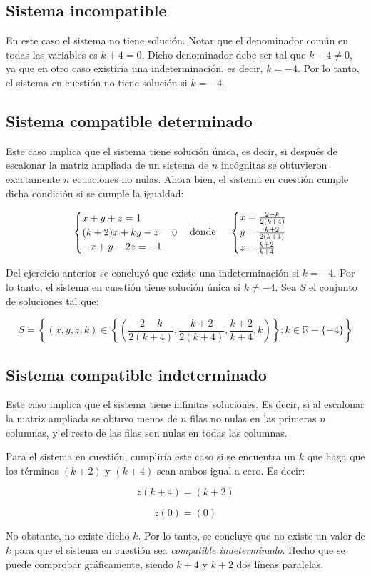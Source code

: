 \documentclass[a4paper,spanish]{article}
\begin{document}
\subsection*{Sistema incompatible}

En este caso el sistema no tiene solución. Notar que el denominador común en todas las variables es $k + 4 = 0$. Dicho denominador debe ser tal que $k+4 \neq 0$, ya que en otro caso existiría una indeterminación, es decir, $k = -4$. Por lo tanto, el sistema en cuestión no tiene solución si $k = -4$.

\subsection*{Sistema compatible determinado}

Este caso implica que el sistema tiene solución única, es decir, si después de escalonar la matriz ampliada de un sistema de $n$ incógnitas se obtuvieron exactamente $n$ ecuaciones no nulas. Ahora bien, el sistema en cuestión cumple dicha condición si se cumple la igualdad:

\[
    \begin{cases}
        x + y + z = 1       \\
        (k+2)x + ky -z  = 0 \\
        -x +y -2z = -1
    \end{cases}
    \text{donde \quad}
    \begin{cases}
        x  = \frac{2-k}{2(k+4)} \\
        y = \frac{k+2}{2(k+4)}  \\
        z = \frac{k+2}{k+4}
    \end{cases}
\]

Del ejercicio anterior se concluyó que existe una indeterminación si $k = -4$. Por lo tanto, el sistema en cuestión tiene solución única si $k\neq-4$. Sea $S$ el conjunto de soluciones tal que:

\[
    S = \left\{
    (x, y, z, k)
    \in
    \left\{ (\frac{2-k}{2(k+4)}, \frac{k+2}{2(k+4)}, \frac{k+2}{k+4}, k) \right\}:
    k \in \mathbb{R} - \{-4\}
    \right\}
\]

\subsection*{Sistema compatible indeterminado}

Este caso implica que el sistema tiene infinitas soluciones. Es decir, si al escalonar la matriz ampliada se obtuvo menos de $n$ filas no nulas en las primeras $n$ columnas, y el resto de las filas son nulas en todas las columnas.

Para el sistema en cuestión, cumpliría este caso si se encuentra un $k$ que haga que los términos $(k+2)$ y $(k+4)$ sean ambos igual a cero. Es decir:

\[
    z (k + 4) = (k + 2)
\]

\[
    z (0) = (0)
\]

No obstante, no existe dicho $k$. Por lo tanto, se concluye que no existe un valor de $k$ para que el sistema en cuestión sea \emph{compatible indeterminado}. Hecho que se puede comprobar gráficamente, siendo $k+4$ y $k+2$ dos líneas paralelas.
\end{document}

